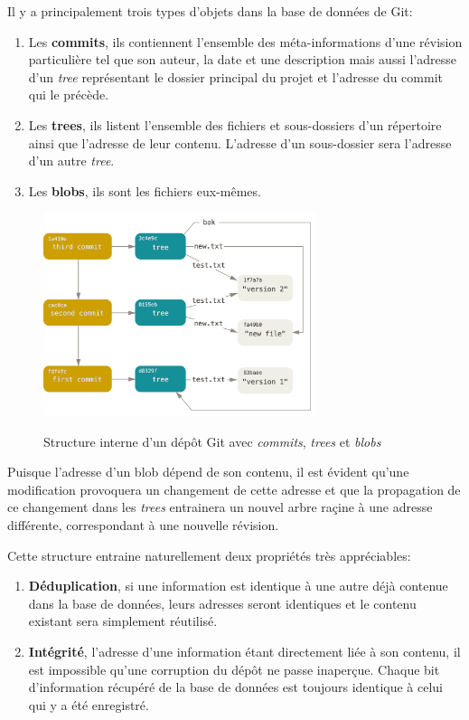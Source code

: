 \documentclass[11pt,a4paper]{article}
\begin{document}
Il y a principalement trois types d'objets dans la base de données de Git:

\begin{enumerate}
	\item Les {\bf commits},
	ils contiennent l'ensemble des méta-informations d'une révision particulière tel que son auteur, la date et une description mais aussi l'adresse d'un \textit{tree} représentant le dossier principal du projet et l'adresse du commit qui le précède.
	
	\item Les {\bf trees},
	ils listent l'ensemble des fichiers et sous-dossiers d'un répertoire ainsi que l'adresse de leur contenu.
	L'adresse d'un sous-dossier sera l'adresse d'un autre \textit{tree}.
	
	\item Les {\bf blobs},
	ils sont les fichiers eux-mêmes.
\end{enumerate}

\begin{figure}[H]
\begin{center}
\includegraphics[width=8cm]{img_structure} \cite{progit}
\caption{Structure interne d'un dépôt Git avec \textit{commits}, \textit{trees} et \textit{blobs}}
\end{center}
\end{figure}

Puisque l'adresse d'un blob dépend de son contenu, il est évident qu'une modification provoquera un changement de cette adresse et que la propagation de ce changement dans les \textit{trees} entrainera un nouvel arbre raçine à une adresse différente, correspondant à une nouvelle révision.

Cette structure entraine naturellement deux propriétés très appréciables:

\begin{enumerate}
	\item \textbf{Déduplication}, 
	si une information est identique à une autre déjà contenue dans la base de données, leurs adresses seront identiques et le contenu existant sera simplement réutilisé.
	
	\item \textbf{Intégrité},
	l'adresse d'une information étant directement liée à son contenu, il est impossible qu'une corruption du dépôt ne passe inaperçue.
	Chaque bit d'information récupéré de la base de données est toujours identique à celui qui y a été enregistré.
\end{enumerate}
\end{document}
